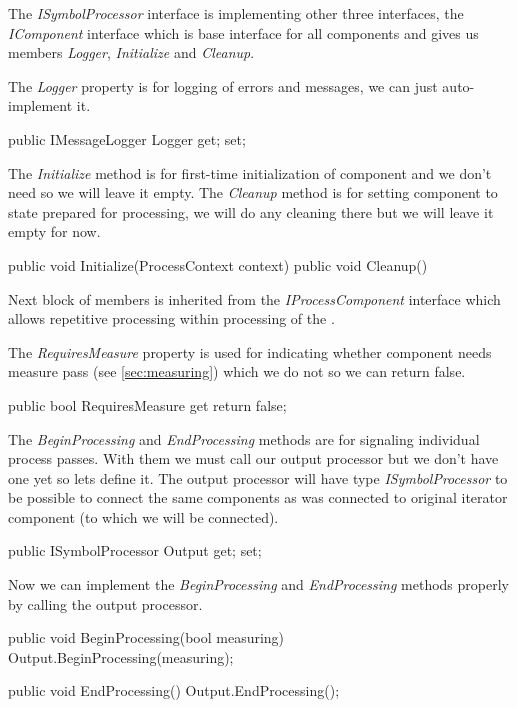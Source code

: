 The \emph{ISymbolProcessor} interface is implementing other three interfaces, the \emph{IComponent} interface which is base interface for all components and gives us members \emph{Logger}, \emph{Initialize} and \emph{Cleanup}.

The \emph{Logger} property is for logging of errors and messages, we can just auto-implement it.

\begin{Csharp}
public IMessageLogger Logger { get; set; }
\end{Csharp}

The \emph{Initialize} method is for first-time initialization of component and we don't need so we will leave it empty.
The \emph{Cleanup} method is for setting component to state prepared for processing, we will do any cleaning there but we will leave it empty for now.

\begin{Csharp}public void Initialize(ProcessContext context) { }
	public void Cleanup() { }
\end{Csharp}

Next block of members is inherited from the \emph{IProcessComponent} interface which allows repetitive processing within processing of the \lsystem.

The \emph{RequiresMeasure} property is used for indicating whether component needs measure pass (see \autoref{sec:measuring}) which we do not so we can return false.

\begin{Csharp}
public bool RequiresMeasure { get { return false; } }
\end{Csharp}

The \emph{BeginProcessing} and \emph{EndProcessing} methods are for signaling individual process passes.
With them we must call our output processor but we don't have one yet so lets define it.
The output processor will have type \emph{ISymbolProcessor} to be possible to connect the same components as was connected to original iterator component (to which we will be connected).

\begin{Csharp}
[UserConnectable]
public ISymbolProcessor Output { get; set; }
\end{Csharp}

Now we can implement the \emph{BeginProcessing} and \emph{EndProcessing} methods properly by calling the output processor.

\begin{Csharp}
public void BeginProcessing(bool measuring) {
	Output.BeginProcessing(measuring);
}

public void EndProcessing() {
	Output.EndProcessing();
}
\end{Csharp}

